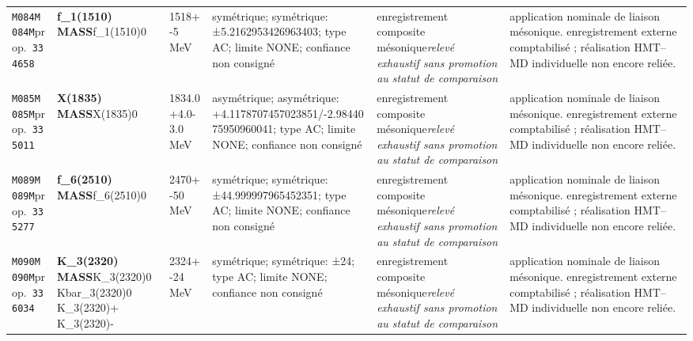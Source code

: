\begin{landscape}
\begin{longtable}{L{1.85cm}L{4.45cm}L{2.35cm}L{4.05cm}L{3.35cm}L{7.15cm}}
\texttt{M084}\newline \texttt{M084M}\newline prop.\ \texttt{334658} & \textbf{f\_\allowbreak{}1(1510) MASS}\newline f\_\allowbreak{}1(1510)0 & 1518+-5\,MeV & symétrique; symétrique: ±5.2162953426963403; type AC; limite NONE; confiance non consigné & enregistrement composite mésonique\newline \emph{relevé exhaustif sans promotion au statut de comparaison} & application nominale de liaison mésonique. enregistrement externe comptabilisé ; réalisation HMT--MD individuelle non encore reliée. \\
\texttt{M085}\newline \texttt{M085M}\newline prop.\ \texttt{335011} & \textbf{X(1835) MASS}\newline X(1835)0 & 1834.0+4.0-3.0\,MeV & asymétrique; asymétrique: +4.1178707457023851/-2.9844075950960041; type AC; limite NONE; confiance non consigné & enregistrement composite mésonique\newline \emph{relevé exhaustif sans promotion au statut de comparaison} & application nominale de liaison mésonique. enregistrement externe comptabilisé ; réalisation HMT--MD individuelle non encore reliée. \\
\texttt{M089}\newline \texttt{M089M}\newline prop.\ \texttt{335277} & \textbf{f\_\allowbreak{}6(2510) MASS}\newline f\_\allowbreak{}6(2510)0 & 2470+-50\,MeV & symétrique; symétrique: ±44.999997965452351; type AC; limite NONE; confiance non consigné & enregistrement composite mésonique\newline \emph{relevé exhaustif sans promotion au statut de comparaison} & application nominale de liaison mésonique. enregistrement externe comptabilisé ; réalisation HMT--MD individuelle non encore reliée. \\
\texttt{M090}\newline \texttt{M090M}\newline prop.\ \texttt{336034} & \textbf{K\_\allowbreak{}3(2320) MASS}\newline K\_\allowbreak{}3(2320)0 \textbar{}\allowbreak{} Kbar\_\allowbreak{}3(2320)0 \textbar{}\allowbreak{} K\_\allowbreak{}3(2320)+ \textbar{}\allowbreak{} K\_\allowbreak{}3(2320)- & 2324+-24\,MeV & symétrique; symétrique: ±24; type AC; limite NONE; confiance non consigné & enregistrement composite mésonique\newline \emph{relevé exhaustif sans promotion au statut de comparaison} & application nominale de liaison mésonique. enregistrement externe comptabilisé ; réalisation HMT--MD individuelle non encore reliée. \\

\end{longtable}
\end{landscape}
